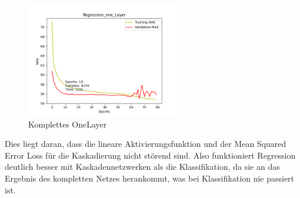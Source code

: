 \begin{figure}[htpb]
    \centering
    \includegraphics[height=5cm]{../../Plots/ba_plots/regression_large/onelayer_complete.png}
    \caption{\label{fig:largeregr2comp} Komplettes OneLayer}
\end{figure}

Dies liegt daran, dass die lineare Aktivierungsfunktion und der Mean Squared Error Loss für die Kaskadierung nicht störend sind. 
Also funktioniert Regression deutlich besser mit Kaskadennetzwerken als die Klassifikation, da sie an das Ergebnis des kompletten Netzes 
herankommt, was bei Klassifikation nie passiert ist. 
